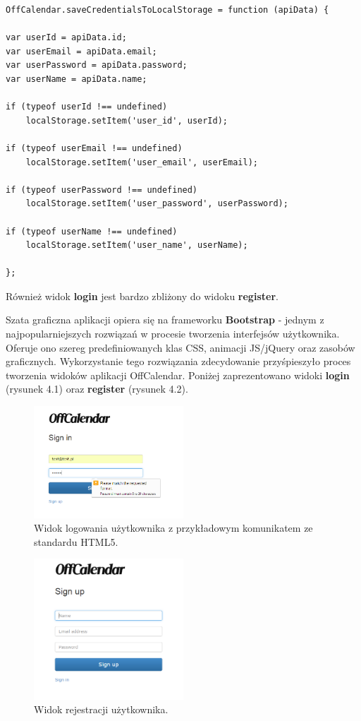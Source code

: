 \begin{lstlisting}[style=js, caption=Zapis danych logowania do obiektu localStorage w pamięci podręcznej przeglądarki., label=amb, captionpos=b]
OffCalendar.saveCredentialsToLocalStorage = function (apiData) {

var userId = apiData.id;
var userEmail = apiData.email;
var userPassword = apiData.password;
var userName = apiData.name;

if (typeof userId !== undefined)
    localStorage.setItem('user_id', userId);

if (typeof userEmail !== undefined)
    localStorage.setItem('user_email', userEmail);

if (typeof userPassword !== undefined)
    localStorage.setItem('user_password', userPassword);

if (typeof userName !== undefined)
    localStorage.setItem('user_name', userName);

};
\end{lstlisting}

Również widok \textbf{login} jest bardzo zbliżony do widoku \textbf{register}.

Szata graficzna aplikacji opiera się na frameworku \textbf{Bootstrap}\cite{bootstrap} - jednym z najpopularniejszych rozwiązań w procesie tworzenia interfejsów użytkownika. Oferuje ono szereg predefiniowanych klas CSS, animacji JS/jQuery oraz zasobów graficznych. Wykorzystanie tego rozwiązania zdecydowanie przyśpieszyło proces tworzenia widoków aplikacji OffCalendar. Poniżej zaprezentowano widoki \textbf{login} (rysunek 4.1) oraz \textbf{register} (rysunek 4.2).

\begin{figure}[H]
\centering
\includegraphics[width=0.5\textwidth]{signin.png}
\caption{Widok logowania użytkownika z przykładowym komunikatem ze standardu HTML5.}
\end{figure}

\begin{figure}[H]
\centering
\includegraphics[width=0.5\textwidth]{register.png}
\caption{Widok rejestracji użytkownika.}
\end{figure}

